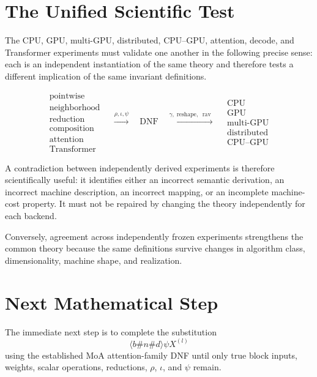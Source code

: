 \documentclass[11pt]{article}
\newcommand{\rav}{\operatorname{rav}}
\begin{document}
\section{The Unified Scientific Test}

The CPU, GPU, multi-GPU, distributed, CPU--GPU, attention, decode, and Transformer experiments
must validate one another in the following precise sense: each is an independent instantiation of
the same theory and therefore tests a different implication of the same invariant definitions.

\[
\boxed{
\begin{array}{c}
\text{pointwise}\\
\text{neighborhood}\\
\text{reduction}\\
\text{composition}\\
\text{attention}\\
\text{Transformer}
\end{array}}
\quad
\xrightarrow{\rho,\iota,\psi}
\quad
\boxed{\text{DNF}}
\quad
\xrightarrow{\gamma,\;\text{reshape},\;\rav}
\quad
\boxed{
\begin{array}{c}
\text{CPU}\\
\text{GPU}\\
\text{multi-GPU}\\
\text{distributed}\\
\text{CPU--GPU}
\end{array}}
\]

A contradiction between independently derived experiments is therefore scientifically useful:
it identifies either an incorrect semantic derivation, an incorrect machine description, an
incorrect mapping, or an incomplete machine-cost property.  It must not be repaired by changing
the theory independently for each backend.

Conversely, agreement across independently frozen experiments strengthens the common theory
because the same definitions survive changes in algorithm class, dimensionality, machine shape,
and realization.

\section{Next Mathematical Step}

The immediate next step is to complete the substitution
\[
\boxed{\langle b\#n\#d\rangle\psi X^{(l)}}
\]
using the established MoA attention-family DNF until only true block inputs, weights, scalar
operations, reductions, \(\rho\), \(\iota\), and \(\psi\) remain.
\end{document}
